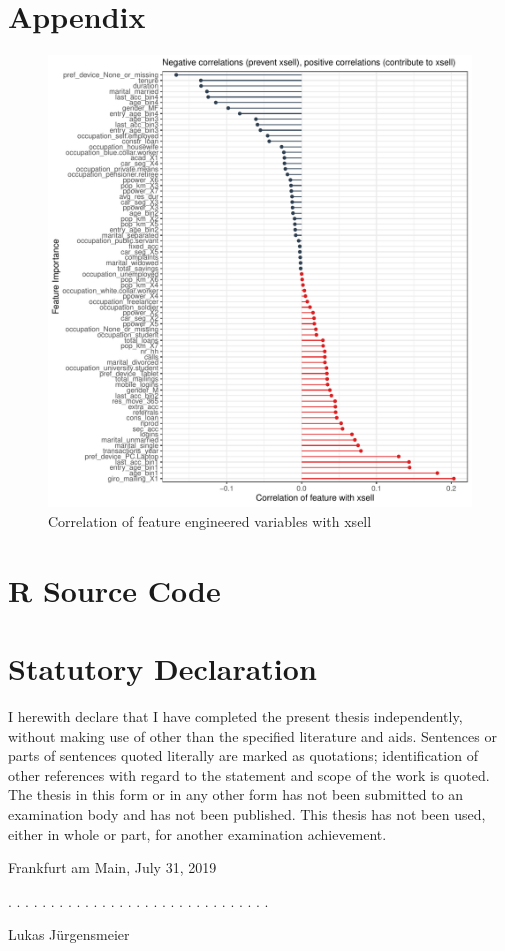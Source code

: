 \documentclass[12pt,a4paper]{article}
\begin{document}
\section{Appendix}
\begin{figure}[ht]
	\centering
  \includegraphics[scale=0.8]{figures/corrplot.pdf}
	\caption{Correlation of feature engineered variables with xsell}
	\label{fig_corr}
\end{figure}

\section{R Source Code}
%
%
%
%

\clearpage


\newpage
\thispagestyle{empty}
\section*{Statutory Declaration}\label{statutory-declaration}

I herewith declare that I have completed the present thesis independently, without making use of
other than the specified literature and aids. Sentences or parts of sentences quoted literally are
marked as quotations; identification of other references with regard to the statement and scope of
the work is quoted. The thesis in this form or in any other form has not been submitted to an examination body and has not been published.
This thesis has not been used, either in whole or part, for another examination achievement.

\vspace{1cm}

Frankfurt am Main, July 31, 2019
\vspace{2cm}

. . . . . . . . . . . . . . . . . . . . . . . . . . . . . . .
\vspace{0.1cm}

Lukas J\"urgensmeier
\end{document}
